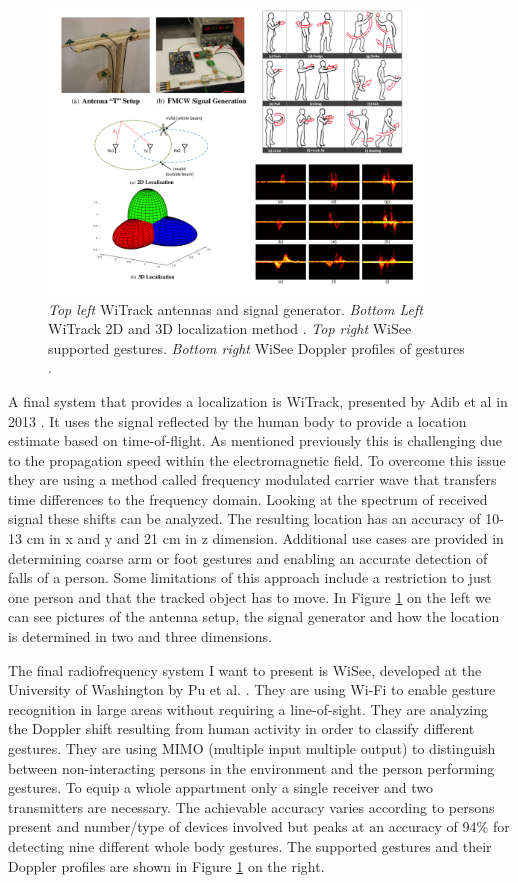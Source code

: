 \begin{figure}[h]
\centering
\includegraphics[width=0.9\textwidth]{images/tech_mic2}
\caption{\emph{Top left} WiTrack antennas and signal generator. \emph{Bottom Left} WiTrack 2D and 3D localization method \cite{adib20133d}. \emph{Top right} WiSee supported gestures. \emph{Bottom right} WiSee Doppler profiles of gestures \cite{pu2013whole}.}
\label{fig:tech_mic2}
\end{figure}

A final system that provides a localization is WiTrack, presented by Adib et al in 2013 \cite{adib20133d}. It uses the signal reflected by the human body to provide a location estimate based on time-of-flight. As mentioned previously this is challenging due to the propagation speed within the electromagnetic field. To overcome this issue they are using a method called frequency modulated carrier wave that transfers time differences to the frequency domain. Looking at the spectrum of received signal these shifts can be analyzed. The resulting location has an accuracy of 10-13 cm in x and y and 21 cm in z dimension. Additional use cases are provided in determining coarse arm or foot gestures and enabling an accurate detection of falls of a person. Some limitations of this approach include a restriction to just one person and that the tracked object has to move. In Figure \ref{fig:tech_mic2} on the left we can see pictures of the antenna setup, the signal generator and how the location is determined in two and three dimensions.

The final radiofrequency system I want to present is WiSee, developed at the University of Washington by Pu et al. \cite{pu2013whole}. They are using Wi-Fi to enable gesture recognition in large areas without requiring a line-of-sight. They are analyzing the Doppler shift resulting from human activity in order to classify different gestures. They are using MIMO (multiple input multiple output) to distinguish between non-interacting persons in the environment and the person performing gestures. To equip a whole appartment only a single receiver and two transmitters are necessary. The achievable accuracy varies according to persons present and number/type of devices involved but peaks at an accuracy of 94\% for detecting nine different whole body gestures. The supported gestures and their Doppler profiles are shown in Figure \ref{fig:tech_mic2} on the right.